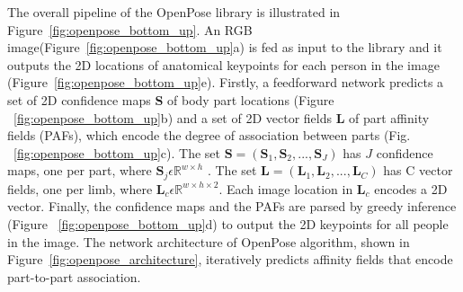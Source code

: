 The overall pipeline of the OpenPose library is illustrated in Figure~\ref{fig:openpose_bottom_up}. An RGB image(Figure~\ref{fig:openpose_bottom_up}a) is fed as input to the library and it outputs the 2D locations of anatomical keypoints for each person in the image (Figure~\ref{fig:openpose_bottom_up}e). Firstly, a feedforward network predicts a set of 2D confidence maps \textbf{S} of body part locations (Figure ~\ref{fig:openpose_bottom_up}b) and a set of 2D vector fields \textbf{L} of part affinity fields (PAFs), which encode the degree of association between parts (Fig. ~\ref{fig:openpose_bottom_up}c). The set $\textbf{S} = (\textbf{S}_1,\textbf{S}_2,...,\textbf{S}_J)$ has $ J $ confidence maps, one per part, where $\textbf{S}_j \epsilon \mathbb {R}^{w\times h}$ . The set $\textbf{L}= (\textbf{L}_1,\textbf{L}_2,...,\textbf{L}_C)$ has C vector fields, one per limb, where $\textbf{L}_c \epsilon \mathbb {R}^{w\times h\times 2}$. Each image location in $\textbf{L}_c$ encodes a 2D vector. Finally, the confidence maps and the PAFs are parsed by greedy inference (Figure ~\ref{fig:openpose_bottom_up}d) to output the 2D keypoints for all people in the image. The network architecture of OpenPose algorithm, shown in Figure~\ref{fig:openpose_architecture}, iteratively predicts affinity fields that  encode part-to-part association.





